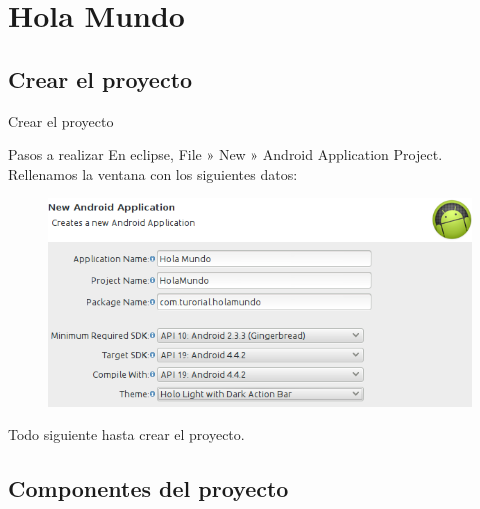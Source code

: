 \documentclass{beamer}
\begin{document}
\section{Hola Mundo}

\subsection{Crear el proyecto}

\begin{frame}{Crear el proyecto}
\begin{block}{Pasos a realizar}
En eclipse, File » New » Android Application Project. Rellenamos la ventana con los siguientes datos:

\begin{figure}[H]
\centering
\includegraphics[scale=.25]{./img/holamundo.png}
\end{figure}
Todo siguiente hasta crear el proyecto.
\end{block}
\end{frame}

\subsection{Componentes del proyecto}
\end{document}
